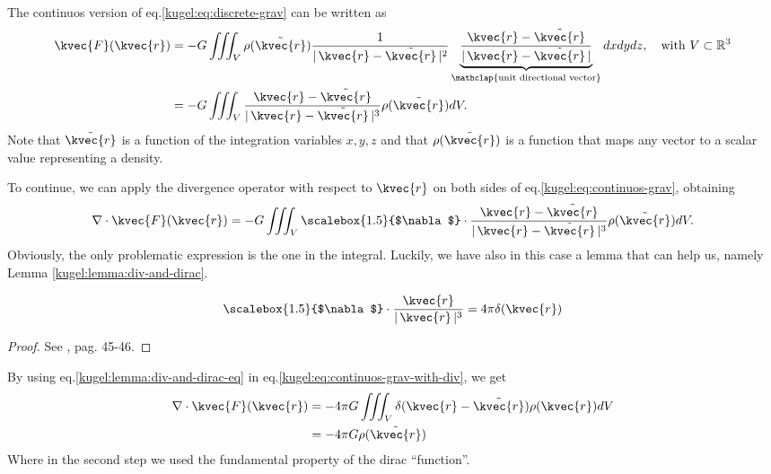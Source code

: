 The continuos version of eq.\eqref{kugel:eq:discrete-grav} can be written as
\begin{align}
  \kvec{F}(\kvec{r}) &= -G \iiint_{V} \rho(\tilde{\kvec{r}})\frac{1}{|\, \kvec{r}-\tilde{\kvec{r}} \,|^2}\underbrace{\frac{\kvec{r}-\tilde{\kvec{r}}}{|\, \kvec{r}-\tilde{\kvec{r}} \,|}}_{\mathclap{\text{unit directional vector}}}dxdydz, \quad \text{with } V \subset \mathbb{R}^3 \nonumber \\
                     &= -G \iiint_{V}\frac{\kvec{r}-\tilde{\kvec{r}}}{|\, \kvec{r}-\tilde{\kvec{r}} \,|^3} \rho(\tilde{\kvec{r}})dV. \label{kugel:eq:continuos-grav} 
\end{align}
Note that $\tilde{\kvec{r}}$ is a function of the integration variables $x,y,z$ and that $\rho(\tilde{\kvec{r}})$ is a function that maps any vector to a scalar value representing a density.

To continue, we can apply the divergence operator with respect to $\kvec{r}$ on both sides of eq.\eqref{kugel:eq:continuos-grav}, obtaining 
\begin{equation}
  \nabla \cdot  \kvec{F}(\kvec{r}) = -G \iiint_{V} \text{\scalebox{1.5}{$\nabla$}} \cdot \frac{\kvec{r}-\tilde{\kvec{r}}}{|\, \kvec{r}-\tilde{\kvec{r}} \,|^3} \rho(\tilde{\kvec{r}})dV. \label{kugel:eq:continuos-grav-with-div} 
\end{equation}
Obviously, the only problematic expression is the one in the integral. Luckily, we have also in this case a lemma that can help us, namely Lemma \ref{kugel:lemma:div-and-dirac}.
\begin{lemma}
  \label{kugel:lemma:div-and-dirac}
  \begin{equation}
    \text{\scalebox{1.5}{$\nabla$}} \cdot \frac{\kvec{r}}{|\,\kvec{r}\,|^3}=4\pi \delta(\kvec{r}) \label{kugel:lemma:div-and-dirac-eq}
  \end{equation}
\end{lemma}
\begin{proof}
  See \cite{griffiths_introduction_2015}, pag. 45-46.
\end{proof}
By using eq.\eqref{kugel:lemma:div-and-dirac-eq} in eq.\eqref{kugel:eq:continuos-grav-with-div}, we get
\begin{align*}
  \nabla \cdot \kvec{F}(\kvec{r}) &= -4\pi G \iiint_{V} \delta(\kvec{r}-\tilde{\kvec{r}}) \rho(\kvec{r}) dV \\
                  &= -4\pi G \rho(\tilde{\kvec{r}})
\end{align*}
Where in the second step we used the fundamental property of the dirac ``function''.

